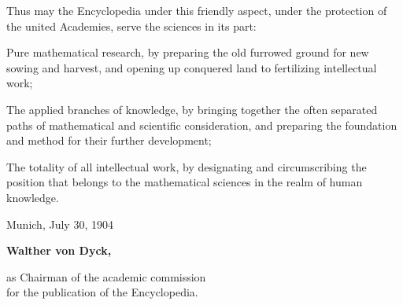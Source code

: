 \thispagestyle{fancy}

\vspace{0.5cm}

Thus may the Encyclopedia under this friendly aspect, under the protection of the united Academies, serve the sciences in its part:

Pure mathematical research, by preparing the old furrowed ground for new sowing and harvest, and opening up conquered land to fertilizing intellectual work;

The applied branches of knowledge, by bringing together the often separated paths of mathematical and scientific consideration, and preparing the foundation and method for their further development;

The totality of all intellectual work, by designating and circumscribing the position that belongs to the mathematical sciences in the realm of human knowledge.

\vspace{1cm}
Munich, July 30, 1904

\vspace{0.5cm}

\begin{minipage}{1.35\textwidth}
\begin{flushright}
\centering
\textbf{Walther von Dyck,}

as Chairman of the academic commission\\
for the publication of the Encyclopedia.
\end{flushright}
\end{minipage}
